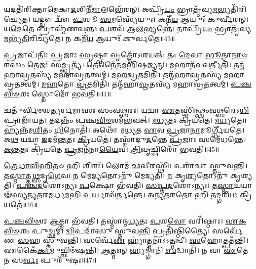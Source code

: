 𑌯𑌦𑌤𑌿᳴𑌰𑌿𑌕𑍍𑌤𑌾𑌮𑍇𑌕𑌾\-\ul{𑌦}\-𑌶𑌿𑌨𑍀᳴\-\ul{𑌮𑌾}\-𑌲𑌭𑍇᳴𑌰𑌨𑍍।
𑌅𑌪𑍍𑌰𑌿᳴\-\ul{𑌯𑌂} 𑌭𑍍𑌰𑌾𑌤𑍃᳴𑌵𑍍𑌯\-\ul{𑌮}\-𑌭𑍍𑌯𑌤𑌿᳴\-𑌰𑌿𑌚𑍍𑌯𑍇𑌤।
𑌯𑌦𑍍𑌦𑍍𑌵𑍗 𑌦𑍍𑌵𑍗᳴ \ul{𑌪}\-𑌶𑍂 \ul{𑌸}\-𑌮𑌸𑍍𑌯𑍇᳴𑌯𑍁𑌃।
𑌕𑌨𑍀᳴\-\ul{𑌯} 𑌆𑌯𑍁𑌃᳴ 𑌕𑍁𑌰𑍍𑌵𑍀𑌰𑌨𑍍।
𑌯\-\ul{𑌦𑍇}\-𑌤𑍇 𑌬𑍍𑌰𑌾𑌹𑍍𑌮᳴𑌣𑌵𑌨𑍍𑌤𑌃 \ul{𑌪}\-𑌶𑌵᳴ 𑌆\-\ul{𑌲}\-𑌭𑍍𑌯𑌨𑍍𑌤𑍇॑।
𑌨𑌾𑌪𑍍𑌰𑌿᳴\-\ul{𑌯𑌂} 𑌭𑍍𑌰𑌾𑌤𑍃᳴𑌵𑍍𑌯\-\ul{𑌮}\-𑌭𑍍𑌯᳴\-\ul{𑌤𑌿}\-𑌰𑌿𑌚𑍍𑌯᳴𑌤𑍇।
𑌨 𑌕𑌨𑍀᳴\-\ul{𑌯} 𑌆𑌯𑍁𑌃᳴ 𑌕𑍁𑌰𑍍𑌵𑌤𑍇॥43॥\anuvakamend[𑌤𑍇 \ul{𑌏}\-𑌵𑌾𑌲᳴𑌭𑌨𑍍𑌤𑍇 𑌮𑍈𑌤𑍍𑌰𑌾𑌵\-\ul{𑌰𑍁}\-𑌣𑍀𑌮𑌾𑌲᳴\-\ul{𑌭}\-𑌨𑍍𑌤𑍇\-𑌽𑌵᳴𑌰𑍁𑌦𑍍𑌧𑍍𑌯𑍈 \ul{𑌸}\-𑌪𑍍𑌤 𑌚᳴]

\-\ul{𑌪𑍍𑌰}\-𑌜𑌾\-𑌪᳴𑌤𑌿𑌃 \ul{𑌪𑍍𑌰}\-𑌜𑌾𑌃 \ul{𑌸𑍃}\-𑌷𑍍𑌟𑍍𑌵𑌾 \ul{𑌵𑍃}\-𑌤𑍍𑌤𑍋᳴\-𑌽𑌶𑌯𑌤𑍍।
𑌤𑌂 \ul{𑌦𑍇}\-𑌵𑌾 \ul{𑌭𑍂}\-𑌤𑌾\-\ul{𑌨𑌾}\-\-\ul{𑍞} 𑌰\-\ul{𑌸𑌂} 𑌤𑍇𑌜𑌃᳴ \ul{𑌸}\-𑌮𑍍𑌭𑍃𑌤𑍍𑌯᳴।
𑌤𑍇𑌨𑍈᳴𑌨𑌮𑌭𑌿𑌷𑌜𑍍𑌯𑌨𑍍।
\-\ul{𑌮}\-𑌹𑌾𑌨᳴𑌵\-\ul{𑌵}\-𑌰𑍍𑌤𑍀𑌤𑌿᳴।
𑌤𑌨𑍍𑌮᳴𑌹𑌾\-\ul{𑌵𑍍𑌰}\-𑌤𑌸𑍍𑌯᳴ 𑌮𑌹𑌾𑌵𑍍𑌰\-\ul{𑌤}\-𑌤𑍍𑌵𑌮𑍍।
\-\ul{𑌮}\-𑌹\-\ul{𑌦𑍍𑌵𑍍𑌰}\-𑌤𑌮𑌿𑌤𑌿᳴।
𑌤𑌨𑍍𑌮᳴𑌹𑌾\-\ul{𑌵𑍍𑌰}\-𑌤𑌸𑍍𑌯᳴ 𑌮𑌹𑌾𑌵𑍍𑌰\-\ul{𑌤}\-𑌤𑍍𑌵𑌮𑍍।
\-\ul{𑌮}\-\-\ul{𑌹}\-𑌤𑍋 \ul{𑌵𑍍𑌰}\-𑌤𑌮𑌿𑌤𑌿᳴।
𑌤𑌨𑍍𑌮᳴𑌹𑌾\-\ul{𑌵𑍍𑌰}\-𑌤𑌸𑍍𑌯᳴ 𑌮𑌹𑌾𑌵𑍍𑌰\-\ul{𑌤}\-𑌤𑍍𑌵𑌮𑍍।
\-\ul{𑌪}\-\-\ul{𑌞𑍍𑌚}\-\-\ul{𑌵𑌿}\-\-\ul{𑍞}\-𑌶𑌃 𑌸𑍍𑌤𑍋𑌮𑍋᳴ 𑌭𑌵𑌤𑌿॥44॥

𑌚𑌤𑍁᳴𑌰𑍍𑌵𑌿𑍞𑌶𑌤𑍍𑌯𑌰𑍍𑌧𑌮𑌾𑌸𑌃 𑌸𑌂𑌵\-\ul{𑌥𑍍𑌸}\-𑌰𑌃।
𑌯𑌦𑍍𑌵𑌾 \ul{𑌏}\-𑌤𑌸𑍍𑌮𑌿॑𑌨𑍍𑌥𑍍𑌸𑌂𑌵\-\ul{𑌥𑍍𑌸}\-𑌰𑍇𑌽\-\ul{𑌧𑌿} 𑌪𑍍𑌰𑌾𑌜𑌾᳴𑌯𑌤।
𑌤𑌦𑌨𑍍𑌨𑌂᳴ 𑌪𑌞𑍍𑌚\-\ul{𑌵𑌿}\-\-\ul{𑍞}\-𑌶𑌮᳴𑌭𑌵𑌤𑍍।
\-\ul{𑌮}\-\-\ul{𑌧𑍍𑌯}\-𑌤𑌃 𑌕𑍍𑌰𑌿᳴𑌯𑌤𑍇।
\-\ul{𑌮}\-\-\ul{𑌧𑍍𑌯}\-𑌤𑍋 𑌹𑍍𑌯𑌨𑍍𑌨᳴𑌮\-\ul{𑌶𑌿}\-𑌤𑌂 \ul{𑌧𑌿}\-𑌨𑍋𑌤𑌿᳴।
𑌅𑌥𑍋᳴ 𑌮\-\ul{𑌧𑍍𑌯}\-𑌤 \ul{𑌏}\-𑌵 \ul{𑌪𑍍𑌰}\-𑌜𑌾\-\ul{𑌨𑌾}\-𑌮𑍂𑌰𑍍𑌗𑍍𑌧𑍀᳴𑌯𑌤𑍇।
𑌅\-\ul{𑌥} 𑌯𑌦𑍍𑌵𑌾 \ul{𑌇}\-𑌦𑌮᳴\-\ul{𑌨𑍍𑌤}\-𑌤𑌃 \ul{𑌕𑍍𑌰𑌿}\-𑌯𑌤𑍇॑।
𑌤𑌸𑍍𑌮𑌾᳴𑌦𑍁\-\ul{𑌦}\-𑌨𑍍𑌤𑍇 \ul{𑌪𑍍𑌰}\-𑌜𑌾𑌃 𑌸𑌮𑍇᳴𑌧𑌨𑍍𑌤𑍇।
\-\ul{𑌅}\-\-\ul{𑌨𑍍𑌤}\-𑌤𑌃 𑌕𑍍𑌰𑌿᳴𑌯𑌤𑍇 \ul{𑌪𑍍𑌰}\-𑌜𑌨᳴𑌨𑌾\-\ul{𑌯𑍈}\-𑌵।
\-\ul{𑌤𑍍𑌰𑌿}\-𑌵𑍃𑌚𑍍𑌛𑌿𑌰𑍋᳴ 𑌭𑌵𑌤𑌿॥45॥

\-\ul{𑌤𑍍𑌰𑍇}\-\-\ul{𑌧𑌾}\-\-\ul{𑌵𑌿}\-\-\ul{𑌹𑌿}\-𑌤𑍞 𑌹𑌿 𑌶𑌿𑌰𑌃᳴।
𑌲𑍋𑌮᳴ \ul{𑌛}\-𑌵𑍀𑌰𑌸𑍍𑌥𑌿᳴।
𑌪𑌰𑌾᳴𑌚𑌾 𑌸𑍍𑌤𑍁𑌵𑌨𑍍𑌤𑌿।
𑌤\-\ul{𑌸𑍍𑌮𑌾}\-𑌤𑍍𑌤\-\ul{𑌥𑍍𑌸}\-𑌦𑍃\-\ul{𑌗𑍇}\-𑌵।
𑌨 𑌮𑍇\-\ul{𑌦𑍍𑌯}\-𑌤𑍋𑌽𑌨𑍁᳴ 𑌮𑍇𑌦𑍍𑌯𑌤𑌿।
𑌨 𑌕𑍃\-\ul{𑌶𑍍𑌯}\-𑌤𑍋𑌽𑌨𑍁᳴ 𑌕𑍃𑌶𑍍𑌯𑌤𑌿।
\-\ul{𑌪}\-\-\ul{𑌞𑍍𑌚}\-\-\ul{𑌦}\-𑌶𑍋॑\-𑌽𑌨𑍍𑌯𑌃 \ul{𑌪}\-𑌕𑍍𑌷𑍋 𑌭᳴𑌵𑌤𑌿।
\-\ul{𑌸}\-\-\ul{𑌪𑍍𑌤}\-\-\ul{𑌦}\-𑌶𑍋॑\-𑌽𑌨𑍍𑌯𑌃।
𑌤\-\ul{𑌸𑍍𑌮𑌾}\-𑌦𑍍𑌵𑌯𑌾𑍟᳴𑌸𑍍𑌯𑌨𑍍𑌯\-\ul{𑌤}\-𑌰\-\ul{𑌮}\-𑌰𑍍𑌧\-\ul{𑌮}\-𑌭𑌿 \ul{𑌪}\-𑌰𑍍𑌯𑌾𑌵᳴𑌰𑍍𑌤𑌨𑍍𑌤𑍇।
\-\ul{𑌅}\-\-\ul{𑌨𑍍𑌯}\-\-\ul{𑌤}\-𑌰\-\ul{𑌤𑍋} 𑌹𑌿 𑌤𑌦𑍍𑌗𑌰𑍀᳴𑌯𑌃 \ul{𑌕𑍍𑌰𑌿}\-𑌯𑌤𑍇॑॥46॥

\-\ul{𑌪}\-\-\ul{𑌞𑍍𑌚}\-\-\ul{𑌵𑌿}\-\-\ul{𑍞}\-𑌶 \ul{𑌆}\-𑌤𑍍𑌮𑌾 𑌭᳴𑌵𑌤𑌿।
𑌤𑌸𑍍𑌮𑌾॑𑌨𑍍𑌮\-\ul{𑌧𑍍𑌯}\-𑌤𑌃 \ul{𑌪}\-𑌶\-\ul{𑌵𑍋} 𑌵𑌰𑌿᳴𑌷𑍍𑌠𑌾𑌃।
\-\ul{𑌏}\-\-\ul{𑌕}\-\-\ul{𑌵𑌿}\-\-\ul{𑍞}\-𑌶𑌂 𑌪𑍁𑌚𑍍𑌛𑌮𑍍॑।
\-\ul{𑌦𑍍𑌵𑌿}\-𑌪𑌦𑌾᳴𑌸𑍁 𑌸𑍍𑌤𑍁𑌵\-\ul{𑌨𑍍𑌤𑌿} 𑌪𑍍𑌰𑌤𑌿᳴\-𑌷𑍍𑌠𑌿𑌤𑍍𑌯𑍈।
𑌸𑌰𑍍𑌵𑍇᳴𑌣 \ul{𑌸}\-𑌹 𑌸𑍍𑌤𑍁᳴𑌵𑌨𑍍𑌤𑌿।
𑌸𑌰𑍍𑌵𑍇᳴\-\ul{𑌣} 𑌹𑍍𑌯𑌾॑𑌤𑍍𑌮𑌨𑌾॑\-𑌽𑌽\-\ul{𑌤𑍍𑌮}\-𑌨𑍍𑌵𑍀।
\-\ul{𑌸}\-𑌹𑍋𑌤𑍍𑌪𑌤᳴𑌨𑍍𑌤𑌿।
𑌏𑌕𑍈᳴\-\ul{𑌕𑌾}\-𑌮𑍁𑌚𑍍𑌛𑌿𑍞᳴𑌷𑌨𑍍𑌤𑌿।
\-\ul{𑌆}\-𑌤𑍍𑌮𑌨𑍍𑌨𑍍 𑌹𑍍𑌯𑌙𑍍𑌗𑌾᳴𑌨𑌿 \ul{𑌬}\-𑌦𑍍𑌧𑌾𑌨𑌿᳴।
𑌨 𑌵𑌾 \ul{𑌏}\-𑌤𑍇\-\ul{𑌨} 𑌸\-\ul{𑌰𑍍𑌵𑌃} 𑌪𑍁𑌰𑍁᳴𑌷𑌃॥47॥

